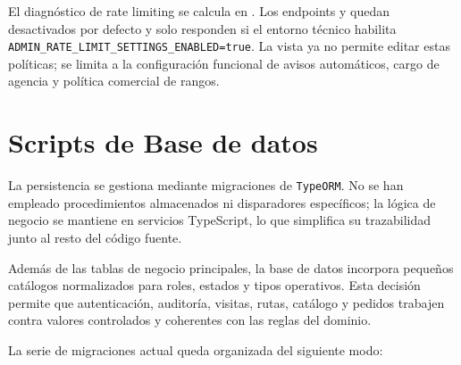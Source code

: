 El diagnóstico de rate limiting se calcula en . Los endpoints  y  quedan desactivados por defecto y solo responden si el entorno técnico habilita \texttt{ADMIN\_RATE\_LIMIT\_SETTINGS\_ENABLED=true}. La vista  ya no permite editar estas políticas; se limita a la configuración funcional de avisos automáticos, cargo de agencia y política comercial de rangos.

\section{Scripts de Base de datos}

La persistencia se gestiona mediante migraciones de \texttt{TypeORM}. No se han empleado procedimientos almacenados ni disparadores específicos; la lógica de negocio se mantiene en servicios TypeScript, lo que simplifica su trazabilidad junto al resto del código fuente.

Además de las tablas de negocio principales, la base de datos incorpora pequeños catálogos normalizados para roles, estados y tipos operativos. Esta decisión permite que autenticación, auditoría, visitas, rutas, catálogo y pedidos trabajen contra valores controlados y coherentes con las reglas del dominio.

La serie de migraciones actual queda organizada del siguiente modo:

